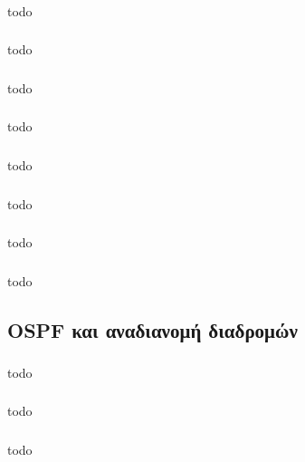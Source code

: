 \documentclass[a4paper, 12pt]{article}
\begin{document}
		\subsubsection{}
			todo

		\subsubsection{}
			todo

		\subsubsection{}
			todo

		\subsubsection{}
			todo

		\subsubsection{}
			todo

		\subsubsection{}
			todo

		\subsubsection{}
			todo

		\subsubsection{}
			todo

	\subsection{OSPF και αναδιανομή διαδρομών}

		\subsubsection{}
			todo

		\subsubsection{}
			todo

		\subsubsection{}
			todo
\end{document}
